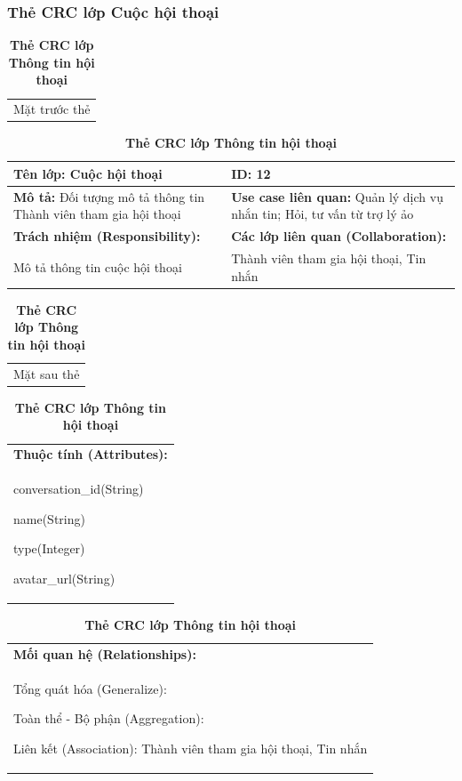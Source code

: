   \subsubsection{Thẻ CRC lớp Cuộc hội thoại}
  \begin{table}[H]
    \caption{\bfseries \fontsize{12pt}{0pt}\selectfont Thẻ CRC lớp Thông tin hội thoại}
    \centering
    \begin{tabularx}{0.9\textwidth}{X}
      Mặt trước thẻ
    \end{tabularx}
    \begin{tabularx}{0.9\textwidth}{|X|X|}
      \hline
      \textbf{Tên lớp:} Cuộc hội thoại & \textbf{ID:} 12 \\
      \hline
      \textbf{Mô tả:} Đối tượng mô tả thông tin Thành viên tham gia hội thoại & \textbf{Use case liên quan:} Quản lý dịch vụ nhắn tin; Hỏi, tư vấn từ trợ lý ảo \\
      \hline
      \textbf{Trách nhiệm (Responsibility):} & \textbf{Các lớp liên quan (Collaboration):} \\
      Mô tả thông tin cuộc hội thoại
      & 
      Thành viên tham gia hội thoại, Tin nhắn
      \\
      \hline
    \end{tabularx}
    \begin{tabularx}{0.9\textwidth}{X}
      Mặt sau thẻ
    \end{tabularx}
    \begin{tabularx}{0.9\textwidth}{|X|}
      \hline
      \textbf{Thuộc tính (Attributes):} \\
      conversation\_id(String) 
      
      name(String)

      type(Integer)

      avatar\_url(String)
      \\
      \hline
    \end{tabularx}
    \begin{tabularx}{0.9\textwidth}{|X|}
      \textbf{Mối quan hệ (Relationships):} \\
      Tổng quát hóa (Generalize):  

      Toàn thể - Bộ phận (Aggregation): 
      
      Liên kết (Association): Thành viên tham gia hội thoại, Tin nhắn 
      \\
      \hline
    \end{tabularx}
  \end{table}

